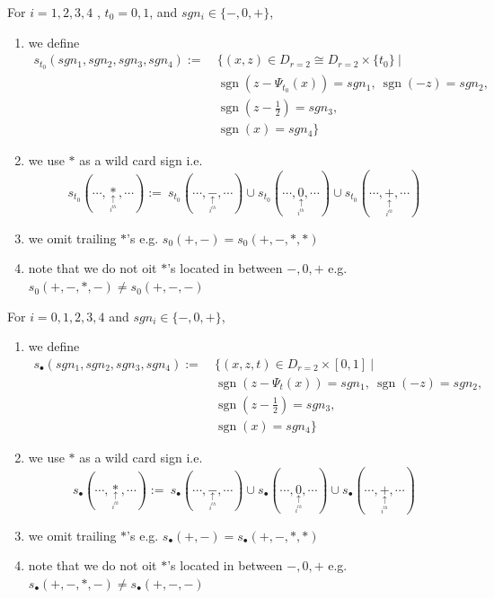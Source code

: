 \begin{definition}
For $i = 1,2,3,4$ , $t_0 = 0,1$, and $sgn_i \in \{-,0,+\}$,
\begin{enumerate}
\item we define
\begin{align*}
s_{t_0}(sgn_1,sgn_2,sgn_3,sgn_4):=~ &\{(x,z) \in D_{r=2}\cong D_{r=2}\times \{t_0\} ~| \\
&\operatorname{sgn}(z-\Psi_{t_0}(x))=sgn_1,~ \operatorname{sgn}(-z)=sgn_2,\\ 
&\operatorname{sgn}(z-\frac{1}{2})=sgn_3,\\
&\operatorname{sgn}(x)=sgn_4 \}
\end{align*}

\item we use $*$ as a wild card sign i.e. 
\[
s_{t_0}(\cdots,\underset{\underset{i^{th}}{\uparrow}}{*},\cdots):=~ s_{t_0}(\cdots,\underset{\underset{i^{th}}{\uparrow}}{-},\cdots)\cup s_{t_0}(\cdots,\underset{\underset{i^{th}}{\uparrow}}{0},\cdots)\cup s_{t_0}(\cdots,\underset{\underset{i^{th}}{\uparrow}}{+},\cdots)
\]

\item we omit trailing $*$'s e.g. $s_0(+,-) = s_0(+,-,*,*)$

\item note that we do not oit $*$'s located in between $-,0,+$ e.g. $s_0(+,-,*,-) \neq s_0(+,-,-)$

\end{enumerate}
\end{definition}

\begin{definition}
For $i = 0,1,2,3,4$ and $sgn_i \in \{-,0,+\}$,
\begin{enumerate}
\item we define
\begin{align*}
s_{\bullet}(sgn_1,sgn_2,sgn_3,sgn_4):=~ &\{(x,z,t) \in D_{r=2}\times [0,1] ~| \\
&\operatorname{sgn}(z-\Psi_{t}(x))=sgn_1,~ \operatorname{sgn}(-z)=sgn_2,\\ 
&\operatorname{sgn}(z-\frac{1}{2})=sgn_3,\\
&\operatorname{sgn}(x)=sgn_4 \}
\end{align*}

\item we use $*$ as a wild card sign i.e. 
\[
s_{\bullet}(\cdots,\underset{\underset{i^{th}}{\uparrow}}{*},\cdots):=~ s_{\bullet}(\cdots,\underset{\underset{i^{th}}{\uparrow}}{-},\cdots)\cup s_{\bullet}(\cdots,\underset{\underset{i^{th}}{\uparrow}}{0},\cdots)\cup s_{\bullet}(\cdots,\underset{\underset{i^{th}}{\uparrow}}{+},\cdots)
\]


\item we omit trailing $*$'s e.g. $s_\bullet(+,-) = s_\bullet(+,-,*,*)$

\item note that we do not oit $*$'s located in between $-,0,+$ e.g. $s_\bullet(+,-,*,-) \neq s_\bullet(+,-,-)$
\end{enumerate}
\end{definition}


